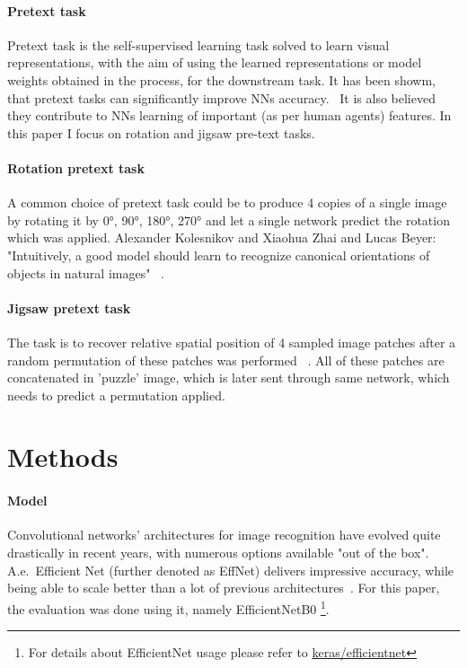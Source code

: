 \paragraph{Pretext task}
Pretext task is the self-supervised learning task solved to learn visual representations,
with the aim of using the learned representations or model weights obtained in the process, for the downstream task.
It has been showm, that pretext tasks can significantly improve NNs accuracy.~\cite{kolesnikov2019revisiting}
It is also believed they contribute to NNs learning of important (as per human agents) features.
In this paper I focus on rotation and jigsaw pre-text tasks.

\paragraph{Rotation pretext task}
A common choice of pretext task could be to produce 4 copies of
a single image by rotating it by {0°, 90°, 180°, 270°} and let a single network predict the rotation which was applied.
Alexander Kolesnikov and Xiaohua Zhai and Lucas Beyer: "Intuitively, a good model should learn to
recognize canonical orientations of objects in natural images" ~\cite{kolesnikov2019revisiting}.

\paragraph{Jigsaw pretext task}
The task is
to recover relative spatial position of 4 sampled image patches
after a random permutation of these patches was performed
~\cite{kolesnikov2019revisiting}.
All of these patches are concatenated in 'puzzle' image,
which is later sent through same network, which needs to predict a permutation applied.



\section{Methods}

\paragraph{Model}
Convolutional networks' architectures for image recognition have evolved quite drastically in recent years,
with numerous options available "out of the box".
A.e.\ Efficient Net (further denoted as EffNet) delivers impressive accuracy,
while being able to scale better than a lot of previous architectures~\cite{DBLP:journals/corr/abs-1905-11946}.
For this paper, the evaluation was done using it, namely EfficientNetB0
\footnote{For details about EfficientNet usage please refer to \href{https://keras.io/api/applications/efficientnet/}{keras/efficientnet}}.

